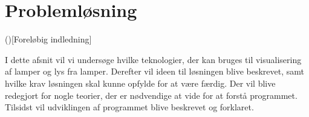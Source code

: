 \section{Problemløsning}
()[Foreløbig indledning]

I dette afsnit vil vi undersøge hvilke teknologier, der kan bruges til visualisering af lamper og lys fra lamper. Derefter vil ideen til løsningen blive beskrevet, samt hvilke krav løsningen skal kunne opfylde for at være færdig. Der vil blive redegjort for nogle teorier, der er nødvendige at vide for at forstå programmet. Tilsidst vil udviklingen af programmet blive beskrevet og forklaret. 










\clearpage